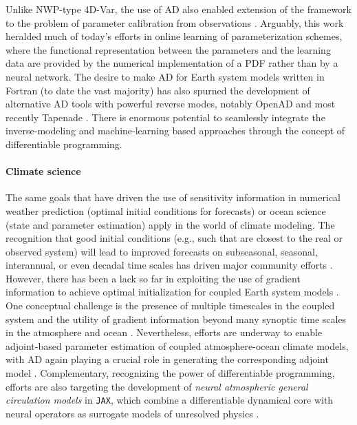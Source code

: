 Unlike NWP-type 4D-Var, the use of AD also enabled extension of the framework to the problem of parameter calibration from observations \cite{Ferreira.2005,Stammer:2005dw,Liu:2012jd}. 
Arguably, this work heralded much of today's efforts in online learning of parameterization schemes, where the functional representation between the parameters and the learning data are provided by the numerical implementation of a PDF rather than by a neural network.
The desire to make AD for Earth system models written in Fortran (to date the vast majority) has also spurned the development of alternative AD tools with powerful reverse modes, notably OpenAD \cite{Utke:2008ko} and most recently Tapenade \cite{Hascoet.2013,Gaikwad.2023,Gaikwad.2024}.
There is enormous potential to seamlessly integrate the inverse-modeling and machine-learning based approaches through the concept of differentiable programming.

\paragraph{Climate science}

The same goals that have driven the use of sensitivity information in numerical weather prediction (optimal initial conditions for forecasts) or ocean science (state and parameter estimation) apply in the world of climate modeling.
The recognition that good initial conditions (e.g., such that are closest to the real or observed system) will lead to improved forecasts on subseasonal, seasonal, interannual, or even decadal time scales has driven major community efforts \cite{Meehl.2021}. However, there has been a lack so far in exploiting the use of gradient information to achieve optimal initialization for coupled Earth system models \cite{Frolov.2023}. 
One conceptual challenge is the presence of multiple timescales in the coupled system and the utility of gradient information beyond many synoptic time scales in the atmosphere and ocean \cite{Lea:2000gv,Lea:2002cv}.
Nevertheless, efforts are underway to enable adjoint-based parameter estimation of coupled atmosphere-ocean climate models, with AD again playing a crucial role in generating the corresponding adjoint model
\cite{Blessing.2014,Lyu.2018,Stammer:2018de}.
Complementary, recognizing the power of differentiable programming, efforts are also targeting the development of \textit{neural atmospheric general circulation models} in \texttt{JAX}, which combine a differentiable dynamical core with neural operators as surrogate models of unresolved physics
\cite{Kochkov.2023}.

